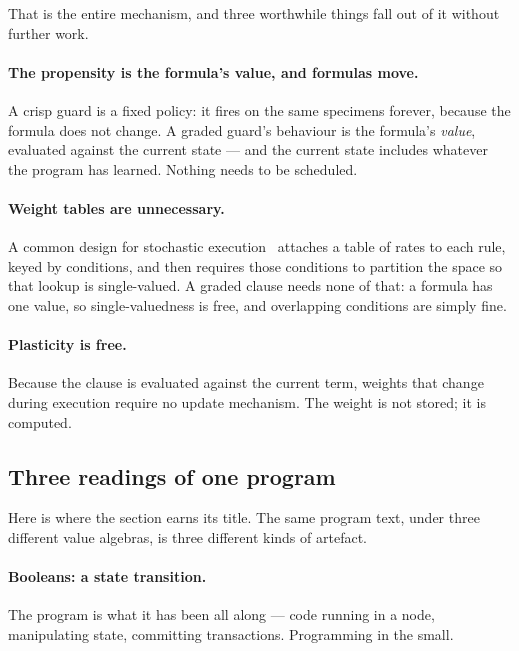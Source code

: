 That is the entire mechanism, and three worthwhile things fall out of it without
further work.

\paragraph{The propensity is the formula's value, and formulas move.} A crisp
guard is a fixed policy: it fires on the same specimens forever, because the
formula does not change. A graded guard's behaviour is the formula's
\emph{value}, evaluated against the current state --- and the current state
includes whatever the program has learned. Nothing needs to be scheduled.

\paragraph{Weight tables are unnecessary.} A common design for stochastic
execution~\cite{WeightedGSLT} attaches a table of rates to each rule, keyed by conditions, and then
requires those conditions to partition the space so that lookup is
single-valued. A graded clause needs none of that: a formula has one value, so
single-valuedness is free, and overlapping conditions are simply fine.

\paragraph{Plasticity is free.} Because the clause is evaluated against the
current term, weights that change during execution require no update mechanism.
The weight is not stored; it is computed.

\subsection{Three readings of one program}

Here is where the section earns its title. The same program text, under three
different value algebras, is three different kinds of artefact.

\paragraph{Booleans: a state transition.} The program is what it has been all
along --- code running in a node, manipulating state, committing transactions.
Programming in the small.

